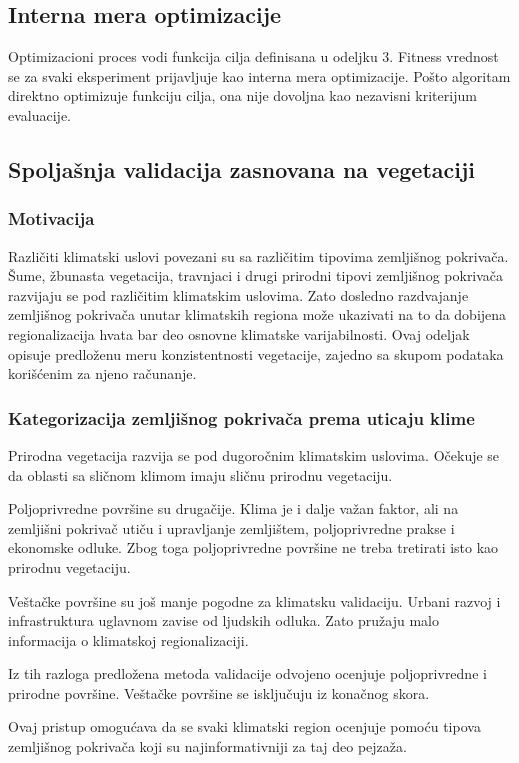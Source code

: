 \documentclass[11pt]{article}
\begin{document}
\subsection{Interna mera optimizacije}
Optimizacioni proces vodi funkcija cilja definisana u odeljku 3. Fitness vrednost se za svaki eksperiment prijavljuje kao interna mera optimizacije. Pošto algoritam direktno optimizuje funkciju cilja, ona nije dovoljna kao nezavisni kriterijum evaluacije.

\subsection{Spoljašnja validacija zasnovana na vegetaciji}
\subsubsection{Motivacija}
Različiti klimatski uslovi povezani su sa različitim tipovima zemljišnog pokrivača. Šume, žbunasta vegetacija, travnjaci i drugi prirodni tipovi zemljišnog pokrivača razvijaju se pod različitim klimatskim uslovima. Zato dosledno razdvajanje zemljišnog pokrivača unutar klimatskih regiona može ukazivati na to da dobijena regionalizacija hvata bar deo osnovne klimatske varijabilnosti. Ovaj odeljak opisuje predloženu meru konzistentnosti vegetacije, zajedno sa skupom podataka korišćenim za njeno računanje.

\subsubsection{Kategorizacija zemljišnog pokrivača prema uticaju klime}
Prirodna vegetacija razvija se pod dugoročnim klimatskim uslovima. Očekuje se da oblasti sa sličnom klimom imaju sličnu prirodnu vegetaciju.

Poljoprivredne površine su drugačije. Klima je i dalje važan faktor, ali na zemljišni pokrivač utiču i upravljanje zemljištem, poljoprivredne prakse i ekonomske odluke. Zbog toga poljoprivredne površine ne treba tretirati isto kao prirodnu vegetaciju.

Veštačke površine su još manje pogodne za klimatsku validaciju. Urbani razvoj i infrastruktura uglavnom zavise od ljudskih odluka. Zato pružaju malo informacija o klimatskoj regionalizaciji.

Iz tih razloga predložena metoda validacije odvojeno ocenjuje poljoprivredne i prirodne površine. Veštačke površine se isključuju iz konačnog skora.

Ovaj pristup omogućava da se svaki klimatski region ocenjuje pomoću tipova zemljišnog pokrivača koji su najinformativniji za taj deo pejzaža.
\end{document}
